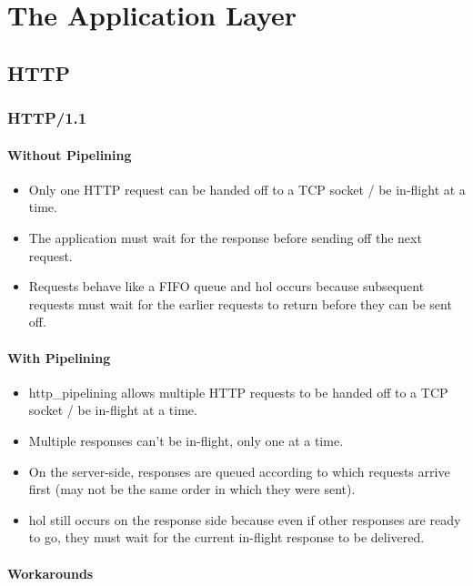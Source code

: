 \documentclass{article}
\begin{document}
\section{The Application Layer}

\subsection{HTTP}

\subsubsection{HTTP/1.1}

\paragraph{Without Pipelining}

\begin{itemize}
    \item Only one HTTP request can be handed off to a TCP socket / be in-flight at a time.
    \item The application must wait for the response before sending off the next request.
    \item Requests behave like a FIFO queue and \gls{hol} occurs because subsequent requests must wait for the earlier requests to return before they can be sent off.
\end{itemize}

\paragraph{With Pipelining}

\begin{itemize}
    \item \gls{http_pipelining} allows multiple HTTP requests to be handed off to a TCP socket / be in-flight at a time.
    \item Multiple responses can't be in-flight, only one at a time.
    \item On the server-side, responses are queued according to which requests arrive first (may not be the same order in which they were sent).
    \item \gls*{hol} still occurs on the response side because even if other responses are ready to go, they must wait for the current in-flight response to be delivered.
\end{itemize}

\paragraph{Workarounds}
\end{document}
